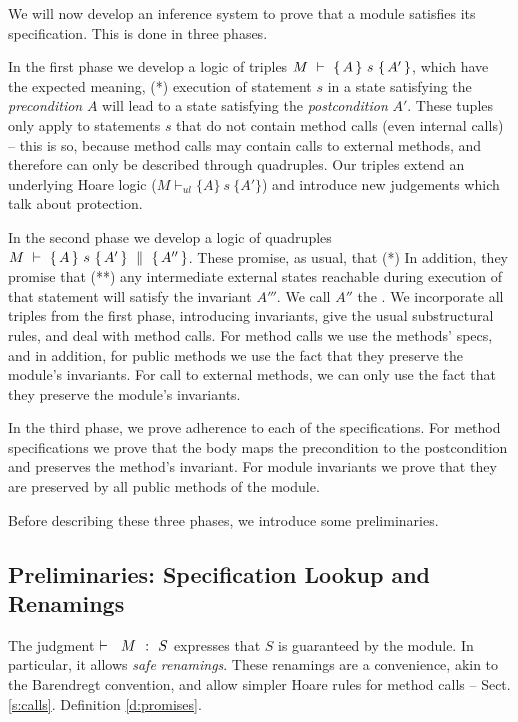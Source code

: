 We will now develop an inference system to prove that a module %
satisfies its specification. This is done in three phases.

In the first phase we develop a logic of triples ${M\ \vdash\ \{\,A\, \} \ s\  \{\,A'\, \} }$, which have the expected meaning, \ie 
(*) execution of statement $s$ in a state satisfying {the \emph{precondition}}  $A$ will lead to a state satisfying  {the \emph{postcondition}}  $A'$.
These tuples only apply to statements $s$ that  do not contain method calls  (even internal calls) -- this is so, because method calls may contain calls to external methods, and therefore can only be described through quadruples.
Our triples extend an underlying Hoare logic  (${M \vdash_{ul}  \{A\} {\ s\ } \{A'\} }$) and  introduce new judgements  which talk about protection.

In the second phase we develop a logic of quadruples ${M\ \vdash\ \{\,A\, \} \ s\  \{\,A'\, \}\, \,\parallel\,\, \{\, A'' \, \}}$. These promise, as usual, that (*) 
In addition, they promise that (**) any intermediate external states reachable during execution of that statement will satisfy the invariant  $A'''$.  
{We call $A''$ the \midcond.}
 We incorporate all triples from the first phase,       
introducing invariants, give the usual substructural rules, and deal with method calls. 
For method calls we use the methods' specs, and in addition, for public methods we use the fact that they preserve the module's invariants. 
For call to external  methods, we can only use the fact that they preserve the module's invariants. 
 
In the third phase, we prove adherence to each of the specifications. 
For method specifications we prove that the body maps the precondition to the postcondition and preserves the method's invariant. 
For module invariants we prove that they  are preserved by all public methods of the module.

\vspace{.1cm}
Before describing these three phases, we introduce some preliminaries.


\subsection{Preliminaries: Specification Lookup and Renamings}

The judgment    ${\vdash \ \ M\ \ \mathbf{:}\ \ S}$ expresses that $S$ is guaranteed by the module. 
In particular, it allows   \emph{safe  renamings}. 
These renamings are   a convenience, akin to the Barendregt convention, and  allow simpler Hoare rules for  method calls -- \cf Sect. \ref{s:calls}.
\Cf Definition \ref{d:promises}.


